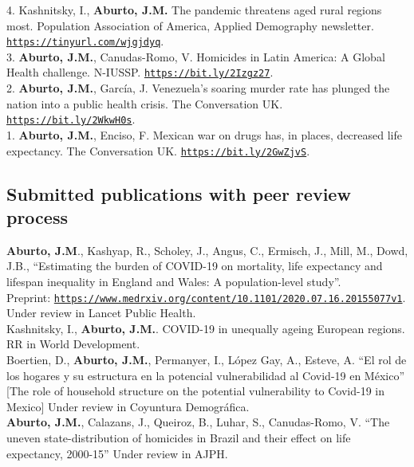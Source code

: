 \documentclass[12pt]{article}
\providecommand*\url[1]{\href{#1}{#1}}
\renewcommand*\url[1]{\href{#1}{\texttt{#1}}}
\begin{document}
4. Kashnitsky, I., \textbf{Aburto, J.M.} The pandemic threatens aged rural regions most. Population Association of America, Applied Demography newsletter. \url{https://tinyurl.com/wjgjdyq}.\\

3. \textbf{Aburto, J.M.}, Canudas-Romo, V. Homicides in Latin America: A Global Health challenge. N-IUSSP. \url{https://bit.ly/2Izgz27}.\\

2. \textbf{Aburto, J.M.}, Garc\'ia, J. Venezuela's soaring murder rate has plunged the nation into a public health crisis. The Conversation UK.\\ \url{https://bit.ly/2WkwH0s}.\\

1. \textbf{Aburto, J.M.}, Enciso, F. Mexican war on drugs has, in places, decreased life expectancy. The Conversation UK. \url{https://bit.ly/2GwZjvS}.\\

\subsection*{Submitted publications with peer review process}	

\textbf{Aburto, J.M}., Kashyap, R., Scholey, J., Angus, C., Ermisch, J., Mill, M., Dowd, J.B., ``Estimating the burden of COVID-19 on mortality, life expectancy and lifespan inequality in England and Wales: A population-level study''. \\
Preprint: \url{https://www.medrxiv.org/content/10.1101/2020.07.16.20155077v1}. Under review in Lancet Public Health.\\

Kashnitsky, I., \textbf{Aburto, J.M.}. COVID-19 in unequally ageing European regions. RR in World Development. \\

Boertien, D., \textbf{Aburto, J.M.},  Permanyer, I., López Gay, A., Esteve, A. ``El rol de los hogares y su estructura en la potencial vulnerabilidad al Covid-19 en México'' [The role of household structure on the potential vulnerability to Covid-19 in Mexico] Under review in Coyuntura Demogr\'afica. \\


\textbf{Aburto, J.M.},  Calazans, J., Queiroz, B., Luhar, S., Canudas-Romo, V. ``The uneven state-distribution of homicides in Brazil and their effect on life expectancy, 2000-15'' Under review in AJPH. \\
\end{document}
